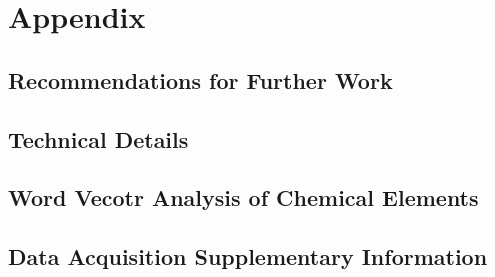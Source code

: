 \chapter{Appendix}

\section{Recommendations for Further Work}

\newpage
\section{Technical Details}

\newpage
\section{Word Vecotr Analysis of Chemical Elements}

\newpage
\section{Data Acquisition Supplementary Information}
